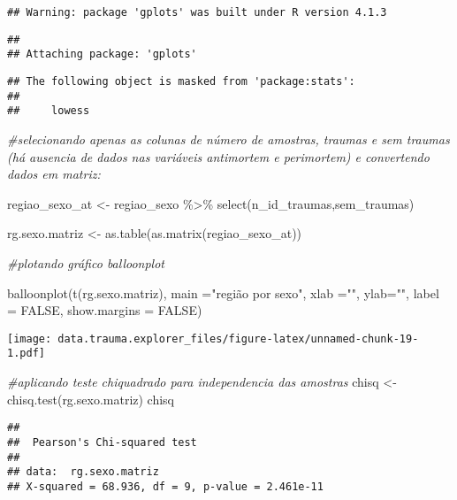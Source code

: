 \documentclass[
]{article}
\newenvironment{Shaded}{\begin{snugshade}}{\end{snugshade}}
\newcommand{\AttributeTok}[1]{\textcolor[rgb]{0.77,0.63,0.00}{#1}}
\newcommand{\CommentTok}[1]{\textcolor[rgb]{0.56,0.35,0.01}{\textit{#1}}}
\newcommand{\ConstantTok}[1]{\textcolor[rgb]{0.00,0.00,0.00}{#1}}
\newcommand{\FunctionTok}[1]{\textcolor[rgb]{0.00,0.00,0.00}{#1}}
\newcommand{\NormalTok}[1]{#1}
\newcommand{\OtherTok}[1]{\textcolor[rgb]{0.56,0.35,0.01}{#1}}
\newcommand{\SpecialCharTok}[1]{\textcolor[rgb]{0.00,0.00,0.00}{#1}}
\newcommand{\StringTok}[1]{\textcolor[rgb]{0.31,0.60,0.02}{#1}}
\begin{document}
\begin{verbatim}
## Warning: package 'gplots' was built under R version 4.1.3
\end{verbatim}

\begin{verbatim}
## 
## Attaching package: 'gplots'
\end{verbatim}

\begin{verbatim}
## The following object is masked from 'package:stats':
## 
##     lowess
\end{verbatim}

\begin{Shaded}
\begin{Highlighting}[]
\CommentTok{\#selecionando apenas as  colunas de número de amostras, traumas e sem traumas (há ausencia de dados nas variáveis antimortem e perimortem) e  convertendo dados em matriz:}

\NormalTok{regiao\_sexo\_at }\OtherTok{\textless{}{-}}\NormalTok{ regiao\_sexo }\SpecialCharTok{\%\textgreater{}\%} \FunctionTok{select}\NormalTok{(n\_id\_traumas,sem\_traumas)}

\NormalTok{rg.sexo.matriz }\OtherTok{\textless{}{-}} \FunctionTok{as.table}\NormalTok{(}\FunctionTok{as.matrix}\NormalTok{(regiao\_sexo\_at))}

\CommentTok{\#plotando gráfico balloonplot }

\FunctionTok{balloonplot}\NormalTok{(}\FunctionTok{t}\NormalTok{(rg.sexo.matriz), }\AttributeTok{main =}\StringTok{"região por sexo"}\NormalTok{, }\AttributeTok{xlab =}\StringTok{""}\NormalTok{, }\AttributeTok{ylab=}\StringTok{""}\NormalTok{,}
            \AttributeTok{label =} \ConstantTok{FALSE}\NormalTok{, }\AttributeTok{show.margins =} \ConstantTok{FALSE}\NormalTok{)}
\end{Highlighting}
\end{Shaded}

\texttt{[image: data.trauma.explorer\_files/figure-latex/unnamed-chunk-19-1.pdf]}

\begin{Shaded}
\begin{Highlighting}[]
\CommentTok{\#aplicando teste chiquadrado para independencia das amostras}
\NormalTok{chisq }\OtherTok{\textless{}{-}} \FunctionTok{chisq.test}\NormalTok{(rg.sexo.matriz)}
\NormalTok{chisq}
\end{Highlighting}
\end{Shaded}

\begin{verbatim}
## 
##  Pearson's Chi-squared test
## 
## data:  rg.sexo.matriz
## X-squared = 68.936, df = 9, p-value = 2.461e-11
\end{verbatim}
\end{document}
